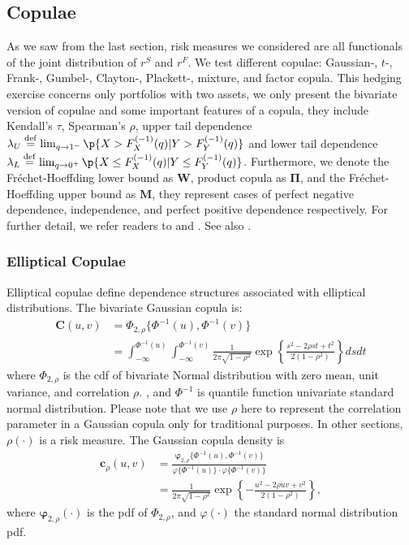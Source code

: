 
\subsection{Copulae}\label{subsec:copulae}
As we saw from the last section, risk measures we considered are all functionals of the joint distribution of $r^S$ and $r^F$.
We test different copulae: Gaussian-, $t$-, Frank-, Gumbel-, Clayton-, Plackett-, mixture, and factor copula.
This hedging exercise concerns only portfolios with two assets, we only present the bivariate version of copulae and some important features of a copula,
they include Kendall's $\tau$, Spearman's $\rho$,
upper tail dependence $\lambda_U \overset{\mathrm{def}}{=}  \lim_{q \rightarrow 1^-} \p\{X > F_{X}^{(-1)}(q)|Y > F_{Y}^{(-1)}(q)\}$ and
lower tail dependence $\lambda_L \overset{\mathrm{def}}{=}  \lim_{q \rightarrow 0^+} \p\{X \leq F_{X}^{(-1)}(q)|Y \leq F_{Y}^{(-1)}(q)\}$.
Furthermore, we denote the Fr{\'e}chet-Hoeffding lower bound as $\bm{W}$, product copula as $\bm{\Pi}$, and the Fr{\'e}chet-Hoeffding upper bound as $\bm{M}$,
they represent cases of perfect negative dependence, independence, and perfect positive dependence respectively.
For further detail, we refer readers to \citet{joe1997multivariate} and \citet{Nelsen1999}.
See also \citet{hardle2010copulis}.

\subsubsection{Elliptical Copulae}\label{sec:ellpitical-copulae}
Elliptical copulae define dependence structures associated with elliptical distributions.
The bivariate Gaussian copula is:
    \begin{align}
        \bm{C}(u,v) &= \Phi_{2, \rho}\{\Phi^{-1}(u), \Phi^{-1}(v)\} \nonumber \\
                    &= \int_{-\infty}^{\Phi^{-1}(u)}
                       \int_{-\infty}^{\Phi^{-1}(v)}
                       \frac{1}{2\pi\sqrt{1-\rho^2}}
                       \exp{\left\{
                       \frac{s^2-2\rho st+t^2}{2(1-\rho^2)}
                       \right\}} ds dt
        \end{align}
where $\Phi_{2, \rho}$ is the cdf of bivariate Normal distribution with zero mean, unit variance, and correlation $\rho$.
, and $\Phi^{-1}$ is quantile function univariate standard normal distribution.
Please note that we use $\rho$ here to represent the correlation parameter in a Gaussian copula only for traditional purposes.
In other sections, $\rho(\cdot)$ is a risk measure.
The Gaussian copula density is
\begin{align}
    \bm{c}_\rho(u,v) &= \frac{\bm{\varphi}_{2,\rho}\{\Phi^{-1}(u), \Phi^{-1}(v)\}}
                        {\varphi\{\Phi^{-1}(u)\} \cdot \varphi\{\Phi^{-1}(v)\}} \nonumber \\
                &= \frac{1}{2\pi\sqrt{1-\rho^2}}\exp\left\{
                   -\frac{u^2 - 2\rho uv + v^2}{2(1-\rho^2)}
                   \right\},
    \end{align}
where $\bm{\varphi}_{2,\rho}(\cdot)$ is the pdf of $\Phi_{2, \rho}$,
and $\varphi(\cdot)$ the standard normal distribution pdf.\medskip

